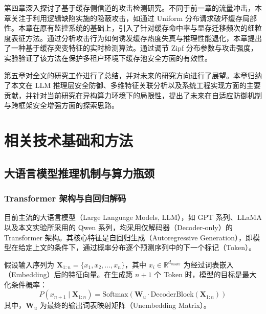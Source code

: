 \documentclass[master, vlined]{DissertUESTC}
\begin{document}
	第四章深入探讨了基于缓存侧信道的攻击检测研究。不同于前一章的流量冲击，本章关注于利用逻辑缺陷实施的隐蔽攻击，如通过 Uniform 分布请求破坏缓存局部性。本章在原有监控系统的基础上，引入了针对缓存命中率与显存迁移频次的细粒度表征方法。通过分析攻击行为如何诱发缓存热度失真与推理性能退化，本章提出了一种基于缓存突变特征的实时检测算法。通过调节 Zipf 分布参数与攻击强度，实验验证了该方法在保护多租户环境下缓存池安全方面的有效性。

	第五章对全文的研究工作进行了总结，并对未来的研究方向进行了展望。本章归纳了本文在 LLM 推理层安全防御、多维特征关联分析以及系统工程实现方面的主要贡献，并针对当前研究在异构算力环境下的局限性，提出了未来在自适应防御机制与跨框架安全增强方面的探索思路。
	
	\chapter{相关技术基础和方法}

	\section{大语言模型推理机制与算力瓶颈}
	\label{sec: 大语言模型推理机制与算力瓶颈}

	\subsection{Transformer 架构与自回归解码}
	目前主流的大语言模型（Large Language Models, LLM），如 GPT 系列、LLaMA 以及本文实验所采用的 Qwen 系列，均采用仅解码器（Decoder-only）的 Transformer 架构\cite{注意力机制是所有你需要的一切}。其核心特征是自回归生成（Autoregressive Generation），即模型在给定上文的条件下，通过概率分布逐个预测序列中的下一个标记（Token）。
	
	假设输入序列为 $\mathbf{X}_{1:n} = \{x_1, x_2, \dots, x_n\}$，其中 $x_i \in \mathbb{R}^{d_{model}}$ 为经过词表嵌入（Embedding）后的特征向量。在生成第 $n+1$ 个 Token 时，模型的目标是最大化条件概率：
	\begin{equation}	
		P(x_{n+1} \mid \mathbf{X}_{1:n}) = \text{Softmax}\left(\mathbf{W}_u \cdot \text{DecoderBlock}(\mathbf{X}_{1:n})\right)
	\end{equation}
	其中，$\mathbf{W}_u$ 为最终的输出词表映射矩阵（Unembedding Matrix）。
\end{document}

